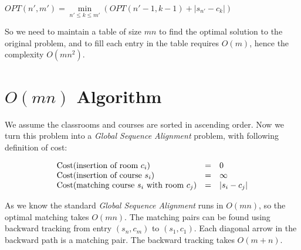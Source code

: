 \begin{center}
  $OPT(n', m') = \min\limits_{n'\leq k \leq m'} (OPT(n'-1, k-1) + |s_{n'} - c_{k}|)$
\end{center}

So we need to maintain a table of size $mn$ to find the optimal solution to the original problem, and to fill each entry in the table requires $O(m)$, hence the  complexity $O(mn^2)$.

\section{$O(mn)$ Algorithm}

We assume the classrooms and courses are sorted in ascending order. Now we turn this problem into a \textit{Global Sequence Alignment} problem, with following definition of cost:

\[
\begin{array}{l l l}
  \text{Cost(insertion of room $c_i$)} & = & 0 \\
  \text{Cost(insertion of course $s_i$)} & = & \infty \\
  \text{Cost(matching course $s_i$ with room $c_j$)} & = & |s_i - c_j|
\end{array}
\]

As we know the standard \textit{Global Sequence Alignment} runs in $O(mn)$, so the optimal matching takes $O(mn)$. The matching pairs can be found using backward tracking from entry $(s_n, c_m)$ to $(s_1, c_1)$. Each diagonal arrow in the backward path is a matching pair. The backward tracking takes $O(m + n)$.